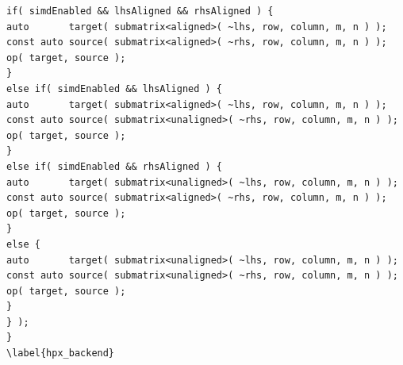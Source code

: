 \begin{lstlisting}[float,floatplacement=H,caption= {Previous implementation of Assign function for HPX backend in Blaze.}, label={old_hpx_backend}]
if( simdEnabled && lhsAligned && rhsAligned ) {
auto       target( submatrix<aligned>( ~lhs, row, column, m, n ) );
const auto source( submatrix<aligned>( ~rhs, row, column, m, n ) );
op( target, source );
}
else if( simdEnabled && lhsAligned ) {
auto       target( submatrix<aligned>( ~lhs, row, column, m, n ) );
const auto source( submatrix<unaligned>( ~rhs, row, column, m, n ) );
op( target, source );
}
else if( simdEnabled && rhsAligned ) {
auto       target( submatrix<unaligned>( ~lhs, row, column, m, n ) );
const auto source( submatrix<aligned>( ~rhs, row, column, m, n ) );
op( target, source );
}
else {
auto       target( submatrix<unaligned>( ~lhs, row, column, m, n ) );
const auto source( submatrix<unaligned>( ~rhs, row, column, m, n ) );
op( target, source );
}
} );
}
\label{hpx_backend}
\end{lstlisting}

